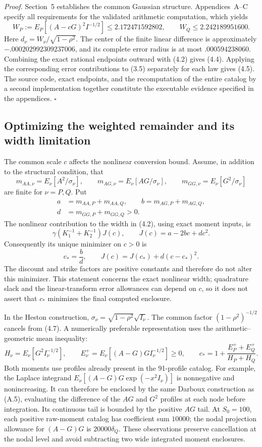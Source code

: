 \documentclass[11pt,a4paper]{article}
\begin{document}
\textit{Proof.} Section~5 establishes the common Gaussian structure. Appendices~A--C specify all requirements for the validated arithmetic computation, which yields
\[
W_P:=E_P[(A-cG)^2I^{-1/2}]\le2.172471592802,\qquad
W_Q\le2.242189951600.
\tag{4.6}
\]
Here \(d_\nu=W_\nu/\sqrt{1-\rho^2}\). The center of the finite linear difference is approximately
\(-.000202992309237006\), and its complete error radius is at most
\(.000594238060\). Combining the exact rational endpoints outward with (4.2) gives (4.4).
Applying the corresponding error contributions to (3.5) separately for each law gives (4.5). The source code, exact endpoints, and the recomputation of the entire catalog by a second implementation together constitute the executable evidence specified in the appendices. \hfill\(\square\)

\subsection{Optimizing the weighted remainder and its width limitation}

The common scale \(c\) affects the nonlinear conversion bound. Assume, in
addition to the structural condition, that
\[
m_{AA,\nu}=E_\nu[A^2/\sigma_\nu],\qquad
m_{AG,\nu}=E_\nu[AG/\sigma_\nu],\qquad
m_{GG,\nu}=E_\nu[G^2/\sigma_\nu]
\]
are finite for \(\nu=P,Q\). Put
\[
\begin{aligned}
a&=m_{AA,P}+m_{AA,Q},\qquad b=m_{AG,P}+m_{AG,Q},\\
d&=m_{GG,P}+m_{GG,Q}>0.
\end{aligned}
\]
The nonlinear contribution to the
width in (4.2), using exact moment inputs, is
\[
\gamma\left(K_1^{-1}+K_2^{-1}\right)J(c),\qquad
J(c)=a-2bc+dc^2.
\]
Consequently its unique minimizer on \(c>0\) is
\[
c_* = \frac{b}{d},\qquad
J(c)=J(c_*)+d(c-c_*)^2.                         \tag{4.7}
\]
The discount and strike factors are positive constants and therefore do not
alter this minimizer. This statement concerns the exact nonlinear width;
quadrature slack and the linear-transform error allowances can depend on \(c\), so
it does not assert that \(c_*\) minimizes the final computed enclosure.

In the Heston construction, \(\sigma_\nu=\sqrt{1-\rho^2}\sqrt{I_\nu}\).
The common factor \((1-\rho^2)^{-1/2}\) cancels from (4.7). A numerically
preferable representation uses the arithmetic--geometric mean inequality:
\[
H_\nu=E_\nu[G^2I_\nu^{-1/2}],\qquad
E_\nu^+=E_\nu[(A-G)GI_\nu^{-1/2}]\ge0,
\qquad
c_* =1+\frac{E_P^++E_Q^+}{H_P+H_Q}.             \tag{4.8}
\]
Both moments use profiles already present in the 91-profile catalog.
For example, the Laplace integrand
\(E_\nu[(A-G)G\exp(-x^2I_\nu)]\) is nonnegative and nonincreasing.
It can therefore be enclosed by the same Darboux construction as (A.5),
evaluating the difference of the \(AG\) and \(G^2\) profiles at each
node before integration. Its continuous tail is bounded by the positive
\(AG\) tail. At \(S_0=100\), each positive raw-moment catalog has coefficient
sum \(10000\); the nodal projection allowance for \((A-G)G\) is
\(20000\delta_Q\). These observations preserve cancellation at the nodal
level and avoid subtracting two wide integrated moment enclosures.
\end{document}
